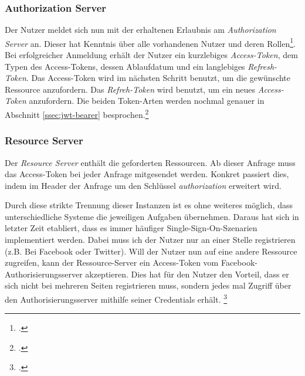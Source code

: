 \subsubsection*{Authorization Server}
\label{sssec:authorization-server}
Der Nutzer meldet sich nun mit der erhaltenen Erlaubnis am \textit{Authorization Server} an. Dieser hat Kenntnis über alle vorhandenen Nutzer und deren Rollen\footcite{online:Implemented_OAuth_Roles}. Bei erfolgreicher Anmeldung erhält der Nutzer ein kurzlebiges \textit{Access-Token}, dem Typen des Access-Tokens, dessen Ablaufdatum und ein langlebiges \textit{Refresh-Token}. Das Access-Token wird im nächsten Schritt benutzt, um die gewünschte Ressource anzufordern. Das \textit{Refreh-Token} wird benutzt, um ein neues \textit{Access-Token} anzufordern. Die beiden Token-Arten werden nochmal genauer in Abschnitt \ref{ssec:jwt-bearer} besprochen.\footcite[S. 287]{book:AngularJs:Steyer2015} 
\subsubsection*{Resource Server}
Der \textit{Resource Server} enthält die geforderten Ressourcen. Ab dieser Anfrage muss das Access-Token bei jeder Anfrage mitgesendet werden. Konkret passiert dies, indem im Header der Anfrage um den Schlüssel \textit{authorization} erweitert wird.

Durch diese strikte Trennung dieser Instanzen ist es ohne weiteres möglich, dass unterschiedliche Systeme die jeweiligen Aufgaben übernehmen. Daraus hat sich in letzter Zeit etabliert, dass es immer häufiger \ac{Single-Sign-On}-Szenarien implementiert werden. Dabei muss ich der Nutzer nur an einer Stelle registrieren (z.B. Bei Facebook oder Twitter). Will der Nutzer nun auf eine andere Ressource zugreifen, kann der Ressource-Server ein Access-Token vom Facebook-Authorisierungsserver akzeptieren. Dies hat für den Nutzer den Vorteil, dass er sich nicht bei mehreren Seiten registrieren muss, sondern jedes mal Zugriff über den Authorisierungsserver mithilfe seiner Credentials erhält. \footcite[S. 294]{book:AngularJs:Steyer2015} 
